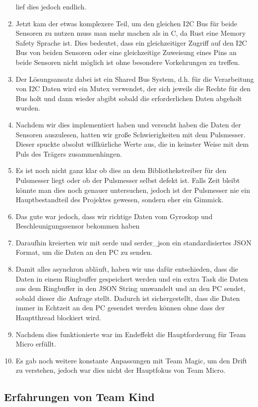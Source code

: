 \documentclass[a4paper, 11pt]{article}
\begin{document}
\begin{enumerate}
    lief dies jedoch endlich.
    \item Jetzt kam der etwas komplexere Teil, um den gleichen I2C Bus für beide Sensoren zu nutzen muss man mehr machen als 
    in C, da Rust eine Memory Safety Sprache ist. Dies bedeutet, dass ein gleichzeitiger Zugriff auf den I2C Bus von beiden Sensoren
    oder eine gleichzeitige Zuweisung eines Pins an beide Sensoren nicht möglich ist ohne besondere Vorkehrungen zu treffen.
    \item Der Lösungsansatz dabei ist ein Shared Bus System, d.h. für die Verarbeitung von I2C Daten wird ein Mutex verwendet, der sich 
    jeweils die Rechte für den Bus holt und dann wieder abgibt sobald die erforderlichen Daten abgeholt wurden.
    \item Nachdem wir dies implementiert haben und versucht haben die Daten der Sensoren auszulesen, hatten wir große Schwierigkeiten mit
    dem Pulsmesser. Dieser spuckte absolut willkürliche Werte aus, die in keinster Weise mit dem Puls des Trägers zusammenhingen.
    \item Es ist noch nicht ganz klar ob dies an dem Bibliothekstreiber für den Pulsmesser liegt oder ob der Pulsmesser selbst defekt ist.
    Falls Zeit bleibt könnte man dies noch genauer untersuchen, jedoch ist der Pulsmesser nie ein Hauptbestandteil des Projektes gewesen,
    sondern eher ein Gimmick.
    \item Das gute war jedoch, dass wir richtige Daten vom Gyroskop und Beschleunigungssensor bekommen haben
    \item Daraufhin kreierten wir mit serde und serder_json ein standardisiertes JSON Format, um die Daten an den PC zu senden.
    \item Damit alles asynchron abläuft, haben wir uns dafür entschieden, dass die Daten in einem Ringbuffer gespeichert werden und
    ein extra Task die Daten aus dem Ringbuffer in den JSON String umwandelt und an den PC sendet, sobald dieser die Anfrage stellt.
    Dadurch ist sichergestellt, dass die Daten immer in Echtzeit an den PC gesendet werden können ohne dass der Hauptthread blockiert wird.
    \item Nachdem dies funktionierte war im Endeffekt die Hauptforderung für Team Micro erfüllt.
    \item Es gab noch weitere konstante Anpassungen mit Team Magic, um den Drift zu verstehen, jedoch war dies nicht der Hauptfokus von Team Micro.
\end{enumerate}

\subsection{Erfahrungen von Team Kind}
\end{document}

